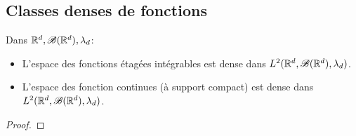 \subsection{Classes denses de fonctions}

\begin{theorem}
	Dans $\mathbb{R}^d, \mathscr{B} (\mathbb{R}^d), \lambda_d$:

	\begin{itemize}
		\item L'espace des fonctions étagées intégrables est dense dans $L^2(\mathbb{R}^d, \mathscr{B} (\mathbb{R}^d), \lambda_d)$.
		\item L'espace des fonction continues (à support compact) est dense dans $L^2(\mathbb{R}^d, \mathscr{B} (\mathbb{R}^d), \lambda_d)$.
	\end{itemize}
\end{theorem}

\begin{proof}
\end{proof}



